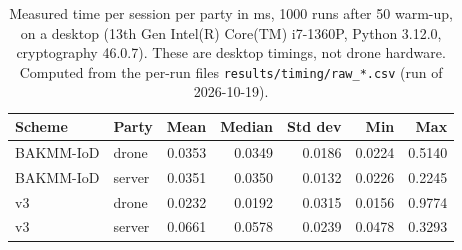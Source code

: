 \begin{table}[!t]
\centering
\footnotesize
\caption{Measured time per session per party in ms, 1000 runs after 50 warm-up, on a desktop (13th Gen Intel(R) Core(TM) i7-1360P, Python 3.12.0, cryptography 46.0.7). These are desktop timings, not drone hardware. Computed from the per-run files \texttt{results/timing/raw\_*.csv} (run of 2026-10-19).}
\label{tab:measured}
\setlength{\tabcolsep}{3pt}
\begin{tabular}{llrrrrr}
\toprule
Scheme & Party & Mean & Median & Std dev & Min & Max \\
\midrule
BAKMM-IoD & drone & 0.0353 & 0.0349 & 0.0186 & 0.0224 & 0.5140 \\
BAKMM-IoD & server & 0.0351 & 0.0350 & 0.0132 & 0.0226 & 0.2245 \\
v3 & drone & 0.0232 & 0.0192 & 0.0315 & 0.0156 & 0.9774 \\
v3 & server & 0.0661 & 0.0578 & 0.0239 & 0.0478 & 0.3293 \\
\bottomrule
\end{tabular}
\end{table}
